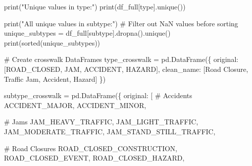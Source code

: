 \documentclass[
  letterpaper,
  DIV=11,
  numbers=noendperiod]{scrartcl}
\newenvironment{Shaded}{\begin{snugshade}}{\end{snugshade}}
\newcommand{\BuiltInTok}[1]{\textcolor[rgb]{0.00,0.23,0.31}{#1}}
\newcommand{\CommentTok}[1]{\textcolor[rgb]{0.37,0.37,0.37}{#1}}
\newcommand{\NormalTok}[1]{\textcolor[rgb]{0.00,0.23,0.31}{#1}}
\newcommand{\OperatorTok}[1]{\textcolor[rgb]{0.37,0.37,0.37}{#1}}
\newcommand{\StringTok}[1]{\textcolor[rgb]{0.13,0.47,0.30}{#1}}
\begin{document}
\begin{Shaded}
\begin{Highlighting}[]
\BuiltInTok{print}\NormalTok{(}\StringTok{"Unique values in \textquotesingle{}type\textquotesingle{}:"}\NormalTok{)}
\BuiltInTok{print}\NormalTok{(df\_full[}\StringTok{\textquotesingle{}type\textquotesingle{}}\NormalTok{].unique())}

\BuiltInTok{print}\NormalTok{(}\StringTok{"All unique values in \textquotesingle{}subtype\textquotesingle{}:"}\NormalTok{)}
\CommentTok{\# Filter out NaN values before sorting}
\NormalTok{unique\_subtypes }\OperatorTok{=}\NormalTok{ df\_full[}\StringTok{\textquotesingle{}subtype\textquotesingle{}}\NormalTok{].dropna().unique()}
\BuiltInTok{print}\NormalTok{(}\BuiltInTok{sorted}\NormalTok{(unique\_subtypes))}

\CommentTok{\# Create crosswalk DataFrames}
\NormalTok{type\_crosswalk }\OperatorTok{=}\NormalTok{ pd.DataFrame(\{}
    \StringTok{\textquotesingle{}original\textquotesingle{}}\NormalTok{: [}\StringTok{\textquotesingle{}ROAD\_CLOSED\textquotesingle{}}\NormalTok{, }\StringTok{\textquotesingle{}JAM\textquotesingle{}}\NormalTok{, }\StringTok{\textquotesingle{}ACCIDENT\textquotesingle{}}\NormalTok{, }\StringTok{\textquotesingle{}HAZARD\textquotesingle{}}\NormalTok{],}
    \StringTok{\textquotesingle{}clean\_name\textquotesingle{}}\NormalTok{: [}\StringTok{\textquotesingle{}Road Closure\textquotesingle{}}\NormalTok{, }\StringTok{\textquotesingle{}Traffic Jam\textquotesingle{}}\NormalTok{, }\StringTok{\textquotesingle{}Accident\textquotesingle{}}\NormalTok{, }\StringTok{\textquotesingle{}Hazard\textquotesingle{}}\NormalTok{] \})}

\NormalTok{subtype\_crosswalk }\OperatorTok{=}\NormalTok{ pd.DataFrame(\{}
    \StringTok{\textquotesingle{}original\textquotesingle{}}\NormalTok{: [}
        \CommentTok{\# Accidents}
        \StringTok{\textquotesingle{}ACCIDENT\_MAJOR\textquotesingle{}}\NormalTok{,}
        \StringTok{\textquotesingle{}ACCIDENT\_MINOR\textquotesingle{}}\NormalTok{,}
        
        \CommentTok{\# Jams}
        \StringTok{\textquotesingle{}JAM\_HEAVY\_TRAFFIC\textquotesingle{}}\NormalTok{,}
        \StringTok{\textquotesingle{}JAM\_LIGHT\_TRAFFIC\textquotesingle{}}\NormalTok{,}
        \StringTok{\textquotesingle{}JAM\_MODERATE\_TRAFFIC\textquotesingle{}}\NormalTok{,}
        \StringTok{\textquotesingle{}JAM\_STAND\_STILL\_TRAFFIC\textquotesingle{}}\NormalTok{,}
        
        \CommentTok{\# Road Closures}
        \StringTok{\textquotesingle{}ROAD\_CLOSED\_CONSTRUCTION\textquotesingle{}}\NormalTok{,}
        \StringTok{\textquotesingle{}ROAD\_CLOSED\_EVENT\textquotesingle{}}\NormalTok{,}
        \StringTok{\textquotesingle{}ROAD\_CLOSED\_HAZARD\textquotesingle{}}\NormalTok{,}
        

\end{Highlighting}
\end{Shaded}
\end{document}

